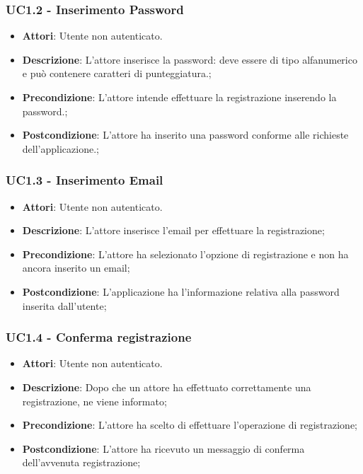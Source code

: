 \subsubsection{UC1.2 - Inserimento Password} 
\label{sssec:UC1.2} 
\begin{itemize} 
\item \textbf{Attori}: Utente non autenticato.
\item \textbf{Descrizione}: L’attore inserisce la password: deve essere di tipo alfanumerico e può contenere caratteri di punteggiatura.;
\item \textbf{Precondizione}: L'attore intende effettuare la registrazione inserendo la password.;
\item \textbf{Postcondizione}: L'attore ha inserito una password conforme alle richieste dell'applicazione.;
\end{itemize} 
\subsubsection{UC1.3 - Inserimento Email} 
\label{sssec:UC1.3} 
\begin{itemize} 
\item \textbf{Attori}: Utente non autenticato.
\item \textbf{Descrizione}: L’attore inserisce l'email per effettuare la registrazione;
\item \textbf{Precondizione}: L'attore ha selezionato l'opzione di registrazione e non ha ancora inserito un email;
\item \textbf{Postcondizione}: L'applicazione ha l’informazione relativa alla password inserita dall’utente;
\end{itemize} 
\subsubsection{UC1.4 - Conferma registrazione} 
\label{sssec:UC1.4} 
\begin{itemize} 
\item \textbf{Attori}: Utente non autenticato.
\item \textbf{Descrizione}: Dopo che un attore ha effettuato correttamente una registrazione, ne viene informato;
\item \textbf{Precondizione}: L'attore ha scelto di effettuare l'operazione di registrazione;
\item \textbf{Postcondizione}: L'attore ha ricevuto un messaggio di conferma dell'avvenuta registrazione;
\end{itemize} 
